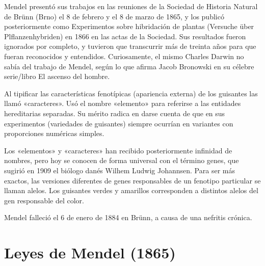 \documentclass{report}
\begin{document}
Mendel presentó sus trabajos en las reuniones de la Sociedad de Historia Natural de Brünn\citep{mendel1866versuche} (Brno) el 8 de febrero y el 8 de marzo de 1865, y los publicó posteriormente como Experimentos sobre hibridación de plantas (Versuche über Plflanzenhybriden) en 1866 en las actas de la Sociedad. Sus resultados fueron ignorados por completo, y tuvieron que transcurrir más de treinta años para que fueran reconocidos y entendidos.\citet{bowler1989evolution} Curiosamente, el mismo Charles Darwin no sabía del trabajo de Mendel, según lo que afirma Jacob Bronowski en su célebre serie/libro El ascenso del hombre.\citep[ver][secc 2]{bronowski1983ascenso}

Al tipificar las características fenotípicas (apariencia externa) de los guisantes las llamó «caracteres». Usó el nombre «elemento» para referirse a las entidades hereditarias separadas. Su mérito radica en darse cuenta de que en sus experimentos (variedades de guisantes) siempre ocurrían en variantes con proporciones numéricas simples.

Los «elementos» y «caracteres» han recibido posteriormente infinidad de nombres, pero hoy se conocen de forma universal con el término genes, que sugirió en 1909 el biólogo danés Wilhem Ludwig Johannsen. Para ser más exactos, las versiones diferentes de genes responsables de un fenotipo particular se llaman alelos. Los guisantes verdes y amarillos corresponden a distintos alelos del gen responsable del color.

Mendel falleció el 6 de enero de 1884 en Brünn, a causa de una nefritis crónica.

\chapter{Leyes de Mendel (1865)}
\end{document}
